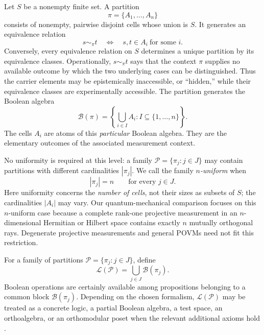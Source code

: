 \documentclass[
  aps,
  pra,
  twocolumn,
  amsmath,
  amssymb,
  longbibliography,
  nofootinbib,
  floatfix
]{revtex4-2}
\newcommand{\cP}{\mathcal P}
\newcommand{\cB}{\mathcal B}
\newcommand{\cL}{\mathcal L}
\begin{document}
Let $S$ be a nonempty finite set.  A partition
\[
  \pi=\{A_1,\ldots,A_n\}
\]
consists of nonempty, pairwise disjoint cells whose union is $S$.  It generates
an equivalence relation
\begin{equation}
  s\sim_\pi t
  \quad\Longleftrightarrow\quad
  s,t\in A_i\ \text{for some }i.
  \label{eq:partition-equivalence}
\end{equation}
Conversely, every equivalence relation on $S$ determines a unique partition by
its equivalence classes.  Operationally, $s\sim_\pi t$ says that the context
$\pi$ supplies no available outcome by which the two underlying cases can be
distinguished.  Thus the carrier elements may be epistemically inaccessible,
or ``hidden,'' while their equivalence classes are experimentally accessible.
The partition generates
the Boolean algebra
\begin{equation}
  \cB(\pi)=
  \left\{\bigcup_{i\in I}A_i: I\subseteq\{1,\ldots,n\}\right\}.
  \label{eq:boolean-partition}
\end{equation}
The cells $A_i$ are atoms of this \emph{particular} Boolean algebra.  They are
the elementary outcomes of the associated measurement context.

No uniformity is required at this level: a family $\cP=\{\pi_j:j\in J\}$ may
contain partitions with different cardinalities $|\pi_j|$.  We call the family
\emph{$n$-uniform} when
\begin{equation}
  |\pi_j|=n\qquad\text{for every }j\in J.
  \label{eq:n-uniform}
\end{equation}
Here uniformity concerns the \emph{number of cells}, not their sizes as subsets
of $S$; the cardinalities $|A_i|$ may vary.  Our quantum-mechanical comparison
focuses on this $n$-uniform case because a complete rank-one projective
measurement in an $n$-dimensional Hermitian or Hilbert space contains exactly
$n$ mutually orthogonal rays.  Degenerate projective measurements and general
POVMs need not fit this restriction.

For a family of partitions $\cP=\{\pi_j:j\in J\}$, define
\begin{equation}
  \cL(\cP)=\bigcup_{j\in J}\cB(\pi_j).
  \label{eq:partition-logic}
\end{equation}
Boolean operations are certainly available among propositions belonging to a
common block $\cB(\pi_j)$.  Depending on the chosen formalism,
$\cL(\cP)$ may be treated as a concrete logic, a partial Boolean algebra, a
test space, an orthoalgebra, or an orthomodular poset when the relevant
additional axioms hold
\cite{Foulis-Randall,dvur-pul-svo,svozil-2001-eua,
Wilce2009TestSpaces,acin-fritz-leverrier-sainz-2015}.
\end{document}

